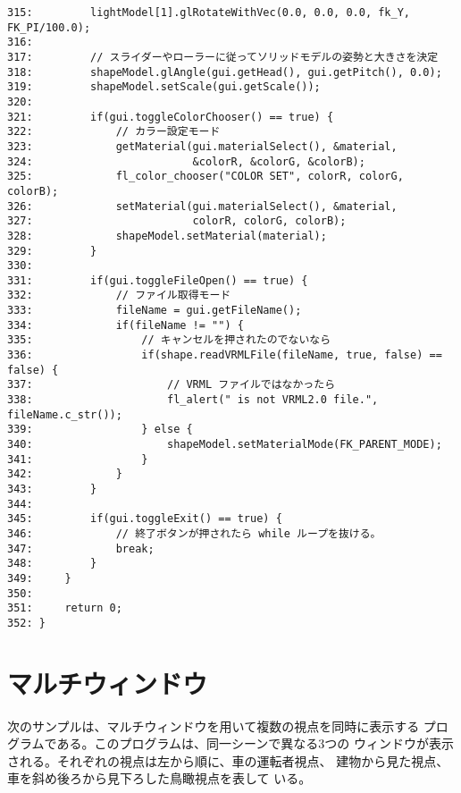 \begin{breakbox}
\begin{verbatim}
315:         lightModel[1].glRotateWithVec(0.0, 0.0, 0.0, fk_Y, FK_PI/100.0);
316: 
317:         // スライダーやローラーに従ってソリッドモデルの姿勢と大きさを決定
318:         shapeModel.glAngle(gui.getHead(), gui.getPitch(), 0.0);
319:         shapeModel.setScale(gui.getScale());
320: 
321:         if(gui.toggleColorChooser() == true) {
322:             // カラー設定モード
323:             getMaterial(gui.materialSelect(), &material,
324:                         &colorR, &colorG, &colorB);
325:             fl_color_chooser("COLOR SET", colorR, colorG, colorB);
326:             setMaterial(gui.materialSelect(), &material,
327:                         colorR, colorG, colorB);
328:             shapeModel.setMaterial(material);
329:         }
330: 
331:         if(gui.toggleFileOpen() == true) {
332:             // ファイル取得モード
333:             fileName = gui.getFileName();
334:             if(fileName != "") {
335:                 // キャンセルを押されたのでないなら
336:                 if(shape.readVRMLFile(fileName, true, false) == false) {
337:                     // VRML ファイルではなかったら
338:                     fl_alert(" is not VRML2.0 file.", fileName.c_str());
339:                 } else {
340:                     shapeModel.setMaterialMode(FK_PARENT_MODE);
341:                 }
342:             }
343:         }
344: 
345:         if(gui.toggleExit() == true) {
346:             // 終了ボタンが押されたら while ループを抜ける。
347:             break;
348:         }
349:     }
350: 
351:     return 0;
352: }
\end{verbatim}
\end{breakbox}
\section{マルチウィンドウ}
次のサンプルは、マルチウィンドウを用いて複数の視点を同時に表示する
プログラムである。このプログラムは、同一シーンで異なる3つの
ウィンドウが表示される。それぞれの視点は左から順に、車の運転者視点、
建物から見た視点、車を斜め後ろから見下ろした鳥瞰視点を表して
いる。

